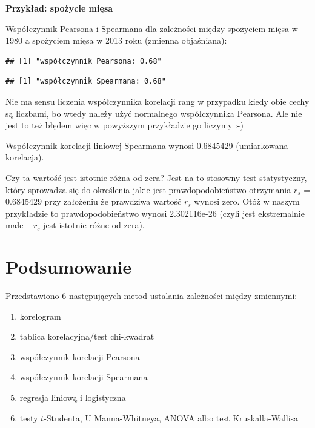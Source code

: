 \documentclass[
  openany]{book}
\begin{document}
\begin{example}
\textbf{Przykład: spożycie mięsa}

Współczynnik Pearsona i Spearmana dla zależności między spożyciem mięsa w 1980
a spożyciem mięsa w 2013 roku (zmienna objaśniana):

\begin{verbatim}
## [1] "współczynnik Pearsona: 0.68"
\end{verbatim}

\begin{verbatim}
## [1] "współczynnik Spearmana: 0.68"
\end{verbatim}

Nie ma sensu liczenia współczynnika korelacji rang w przypadku kiedy obie
cechy są liczbami, bo wtedy należy użyć normalnego współczynnika Pearsona.
Ale nie jest to też błędem więc w powyższym przykładzie
go liczymy :-)

Współczynnik korelacji liniowej Spearmana wynosi 0.6845429 (umiarkowana korelacja).

Czy ta wartość jest istotnie różna od zera? Jest na to stosowny
test statystyczny, który sprowadza się do określenia jakie jest
prawdopodobieństwo otrzymania \(r_s\) = 0.6845429 przy założeniu że
prawdziwa wartość \(r_s\) wynosi zero. Otóż w naszym przykładzie
to prawdopodobieństwo wynosi 2.302116e-26
(czyli jest ekstremalnie małe -- \(r_s\) jest istotnie różne od zera).
\end{example}

\hypertarget{podsumowanie}{%
\section{Podsumowanie}\label{podsumowanie}}

Przedstawiono 6 następujących metod ustalania zależności między zmiennymi:

\begin{enumerate}
\def\labelenumi{\arabic{enumi}.}
\item
  korelogram
\item
  tablica korelacyjna/test chi-kwadrat
\item
  współczynnik korelacji Pearsona
\item
  współczynnik korelacji Spearmana
\item
  regresja liniową i logistyczna
\item
  testy \(t\)-Studenta, U Manna-Whitneya, ANOVA albo test Kruskalla-Wallisa
\end{enumerate}
\end{document}
